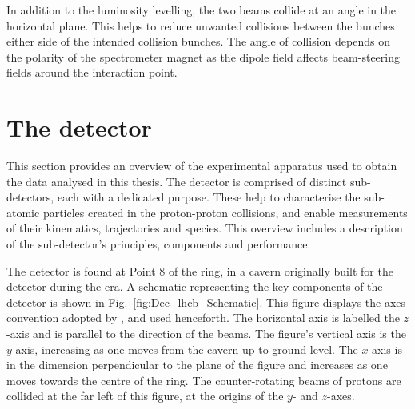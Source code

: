 In addition to the luminosity levelling, the two beams collide at an angle in the horizontal plane. This helps to reduce unwanted collisions between the bunches either side of the intended collision bunches. The angle of collision depends on the polarity of the \lhcb spectrometer magnet as the dipole field affects beam-steering fields around the interaction point. 




\section{The \lhcb detector}

This section provides an overview of the experimental apparatus used to obtain the data analysed in this thesis.
The \lhcb detector is comprised of distinct sub-detectors, each with a dedicated purpose. These help to characterise the sub-atomic particles created in the proton-proton collisions, and enable measurements of their kinematics, trajectories and species.
This overview includes a description of the sub-detector's principles, components and performance. 

The \lhcb detector is found at Point 8 of the \lhc ring, in a cavern originally built for the \delphi detector during the \lep era. A schematic representing the key components of the \lhcb detector is shown in Fig.~\ref{fig:Dec_lhcb_Schematic}. This figure displays the axes convention adopted by \lhcb, and used henceforth. The horizontal axis is labelled the $z$-axis and is parallel to the direction of the beams. The figure's vertical axis is the $y$-axis, increasing as one moves from the cavern up to ground level. The $x$-axis is in the dimension perpendicular to the plane of the figure and increases as one moves towards the centre of the \lhc ring. The counter-rotating beams of protons are collided at the far left of this figure, at the origins of the $y$- and $z$-axes.   

